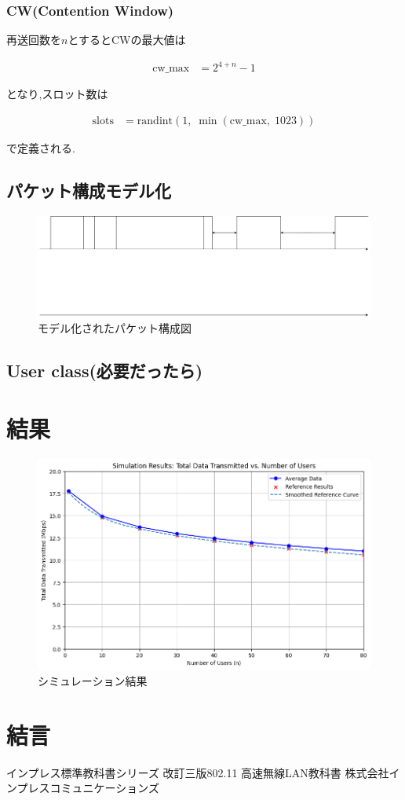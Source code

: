 \documentclass[a4paper, 10pt]{ltjsarticle}
\begin{document}
\subsubsection{CW(Contention Window)}

再送回数を$n$とするとCWの最大値は

\begin{align}
  \text{cw\_max} &= 2^{4 + n} - 1
\end{align}

となり,スロット数は

\begin{align}
  \text{slots} &= \mathrm{randint}(1, \; \min(\text{cw\_max}, \; 1023))
\end{align}

で定義される.


\subsection{パケット構成モデル化}
\begin{figure}[h]
  \centering
  \includegraphics[width=0.9\columnwidth]{./assets/packet.drawio.png}
  \caption{モデル化されたパケット構成図}
\end{figure}


\subsection{User class(必要だったら)}


\section{結果}

\begin{figure}[h]
  \centering
  \includegraphics[width=1\columnwidth]{./assets/graph.png}
  \caption{シミュレーション結果}
\end{figure}

\section{結言}

\begin{thebibliography}{9}
  インプレス標準教科書シリーズ 改訂三版802.11 高速無線LAN教科書 \; 株式会社インプレスコミュニケーションズ
\end{thebibliography}
\end{document}
